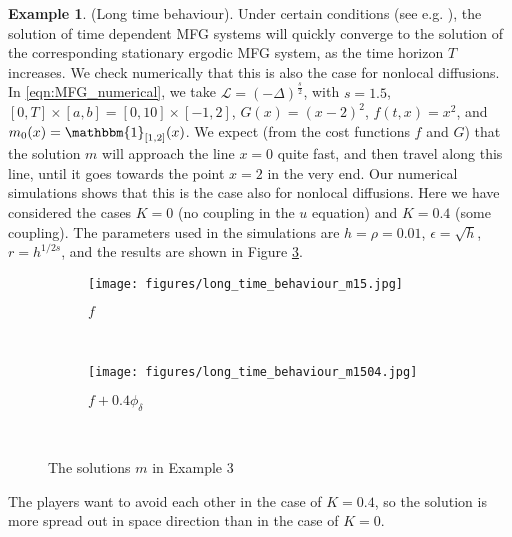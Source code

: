 \documentclass[a4paper,  twoside, 10pt, leqno]{amsart}
\theoremstyle{remark}
\theoremstyle{definition}
\newtheorem{example}{Example}
\begin{document}
\begin{example}\label{ex3}
(Long time behaviour).
Under certain conditions (see e.g. \cite{cardaliaguet2012long, cardaliaguet2013long}), 
the solution of time dependent
MFG systems will quickly converge to the solution of the corresponding
stationary ergodic MFG system, as the time horizon $T$ increases. 
We check numerically that this is also the case for nonlocal diffusions. 
In \eqref{eqn:MFG_numerical}, we take $\mathcal{L} = ( -\Delta )^{\frac{s}{2}}$, with $s=1.5$, $ [ 0,T ] \times [ a,b ] = [ 0,10 ] \times [ -1,2 ]$, 
$G ( x ) = ( x-2 )^{2}$,
 $f ( t,x ) = x^2$, and $m_{0} ( x ) = \mathbbm{1}_{ [ 1,2 ] } ( x )$.
We expect (from the cost functions $f$ and $G$) that
the solution $m$ will approach the line $x=0$ 
quite fast, and then travel along this line, 
until it goes towards the point $x=2$ in the very end. 
Our numerical simulations shows that this is the case 
also for nonlocal diffusions. 
Here we have considered the cases $K=0$ (no coupling in the $u$ equation) and $K = 0.4$ (some coupling).
The parameters used in the simulations are 
$h = \rho = 0.01$, $\epsilon = \sqrt{h}$, $r = h^{1 / 2s}$,
and the results are shown in Figure \ref{fig:long_time}.
\end{example}
\begin{figure}[ht!]
    \centering
    \begin{subfigure}[b]{0.49\textwidth}
        \texttt{[image: figures/long\_time\_behaviour\_m15.jpg]}
        \caption{$f$}
        \label{fig:ex3m15}
    \end{subfigure}
    ~ %
    \begin{subfigure}[b]{0.49\textwidth}
        \texttt{[image: figures/long\_time\_behaviour\_m1504.jpg]}
        \caption{$f+ 0.4 \phi_{\delta}$}
        \label{fig:ex3u15}
    \end{subfigure}
    ~ %
    \caption{ The solutions $m$ in Example 3}\label{fig:long_time}
\end{figure}

The players want to avoid each other in the case of $K=0.4$, so the solution is more spread out in space direction than in the case of $K=0$.
\end{document}
